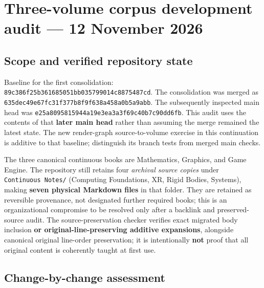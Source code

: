 \hypertarget{appendix-28e6f216fdc7}{}
\section{Three-volume corpus development audit --- 12 November 2026}\label{appendix-28e6f216fdc7-three-volume-corpus-development-audit-12-november-2026}

\subsection{Scope and verified repository state}\label{appendix-28e6f216fdc7-scope-and-verified-repository-state}

Baseline for the first consolidation: \texttt{89c386f25b361685051bb035799014c8875487cd}. The consolidation was merged as \texttt{635dec49e67fc31f377b8f9f638a458a0b5a9abb}. The subsequently inspected main head was \texttt{e25a8095815944a19e3ea3a3f69c40b7c90dd6fb}. This audit uses the contents of that \textbf{later main head} rather than assuming the merge remained the latest state. The new render-graph source-to-volume exercise in this continuation is additive to that baseline; distinguish its branch tests from merged main checks.

The three canonical continuous books are Mathematics, Graphics, and Game Engine. The repository still retains four \emph{archival source copies} under \texttt{Continuous\ Notes/} (Computing Foundations, XR, Rigid Bodies, Systems), making \textbf{seven physical Markdown files} in that folder. They are retained as reversible provenance, not designated further required books; this is an organizational compromise to be resolved only after a backlink and preserved-source audit. The source-preservation checker verifies exact migrated body inclusion \textbf{or original-line-preserving additive expansions}, alongside canonical original line-order preservation; it is intentionally \textbf{not} proof that all original content is coherently taught at first use.

\subsection{Change-by-change assessment}\label{appendix-28e6f216fdc7-change-by-change-assessment}

